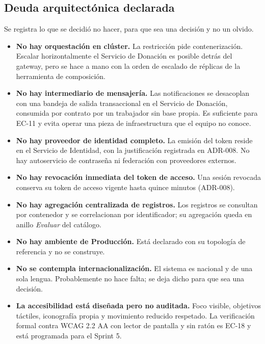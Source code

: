 \documentclass[11pt,a4paper]{article}
\begin{document}
\subsection{Deuda arquitectónica declarada}

Se registra lo que se decidió no hacer, para que sea una decisión y no un olvido.

\begin{itemize}
\item \textbf{No hay orquestación en clúster.} La restricción pide contenerización. Escalar horizontalmente el Servicio de Donación es posible detrás del gateway, pero se hace a mano con la orden de escalado de réplicas de la herramienta de composición.
\item \textbf{No hay intermediario de mensajería.} Las notificaciones se desacoplan con una bandeja de salida transaccional en el Servicio de Donación, consumida por contrato por un trabajador sin base propia. Es suficiente para EC-11 y evita operar una pieza de infraestructura que el equipo no conoce.
\item \textbf{No hay proveedor de identidad completo.} La emisión del token reside en el Servicio de Identidad, con la justificación registrada en ADR-008. No hay autoservicio de contraseña ni federación con proveedores externos.
\item \textbf{No hay revocación inmediata del token de acceso.} Una sesión revocada conserva su token de acceso vigente hasta quince minutos (ADR-008).
\item \textbf{No hay agregación centralizada de registros.} Los registros se consultan por contenedor y se correlacionan por identificador; su agregación queda en anillo \emph{Evaluar} del catálogo.
\item \textbf{No hay ambiente de Producción.} Está declarado con su topología de referencia y no se construye.
\item \textbf{No se contempla internacionalización.} El sistema es nacional y de una sola lengua. Probablemente no hace falta; se deja dicho para que sea una decisión.
\item \textbf{La accesibilidad está diseñada pero no auditada.} Foco visible, objetivos táctiles, iconografía propia y movimiento reducido respetado. La verificación formal contra WCAG 2.2 AA con lector de pantalla y sin ratón es EC-18 y está programada para el Sprint 5.
\end{itemize}

\end{document}
